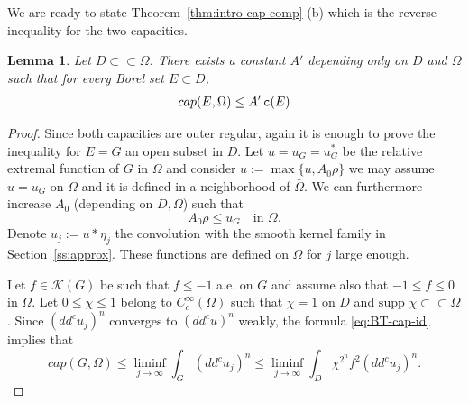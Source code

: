 \documentclass{amsart}
\newcommand{\tc}{{\tt c}}
\newcommand{\Om}{\Omega}
\newcommand{\supp}{\mbox{supp }}
\newcommand{\cali}[1]{\mathscr{#1}}
\newcommand{\Kc}{\cali{K}}
\newtheorem{lem}[thm]{Lemma}
\theoremstyle{definition}
\numberwithin{thm}{section}
\numberwithin{equation}{section}
\renewcommand{\[}{\begin{equation}}
\renewcommand{\]}{\end{equation}}
\begin{document}
We are ready to state Theorem~\ref{thm:intro-cap-comp}-(b) which is the reverse inequality for the two capacities.

\begin{lem} \label{lem:cap-c} Let $D \subset \subset \Om$. There exists  a constant $A'$ depending  only on $D$ and $\Om$ such that for every Borel set $E \subset D$,
$$	cap(E,\Om) \leq A'\, \tc(E)
$$
\end{lem}

\begin{proof} Since both capacities are outer regular, 
again it is enough to prove the inequality for $E=G$ an open subset in $D$. Let $u= u_G=u_G^*$ be the relative extremal function of $G$ in $\Om$ and consider $u:= \max\{u, A_0 \rho\}$ we may assume $u= u_G$ on $\Om$ and it is defined in a neighborhood of $\bar\Om$. We can furthermore increase $A_0$ (depending on $D,\Om$) such that 
\[\label{eq:capc-rho} A_0\rho \leq u_G \quad \text{in }\Om.
\]
Denote $u_j:= u*\eta_j$ the convolution with the smooth kernel family in Section~\ref{ss:approx}. These functions  are defined on $\Om$ for $j$  large enough.

Let $f \in \Kc(G)$ be such that $f \leq -1$ a.e. on $G$ and assume also that $-1\leq f\leq 0$ in $\Om$.  Let $0\leq \chi \leq 1$ belong to $C^\infty_c(\Om)$  such that $\chi =1$ on $D$ and $\supp \chi \subset\subset \Om$. Since $(dd^c u_j)^n$ converges  to $(dd^c u)^n$ weakly, the formula \eqref{eq:BT-cap-id} implies that
\[\label{eq:capc-dominate}
	cap(G,\Om) \leq \liminf_{j\to \infty} \int_G (dd^c u_j)^n \leq \liminf_{j\to \infty} \int_D  \chi^{2^n} f^2 (dd^c u_j)^n.
\]


\end{proof}
\end{document}
